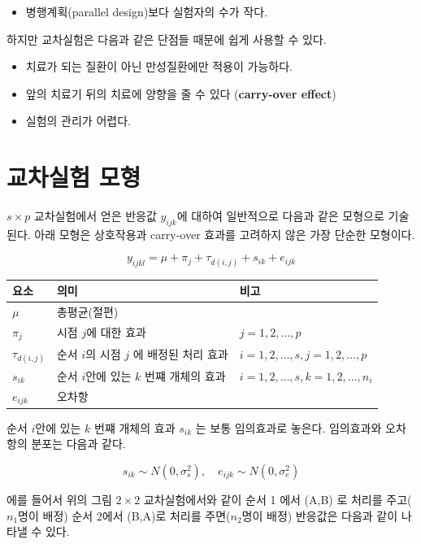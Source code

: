 \documentclass[
]{book}
\providecommand{\tightlist}{%
  \setlength{\itemsep}{0pt}\setlength{\parskip}{0pt}}
\theoremstyle{definition}
\theoremstyle{definition}
\theoremstyle{definition}
\theoremstyle{remark}
\begin{document}
\begin{itemize}
\tightlist
\item
  병행계획(parallel design)보다 실험자의 수가 작다.
\end{itemize}

하지만 교차실험은 다음과 같은 단점들 때문에 쉽게 사용할 수 있다.

\begin{itemize}
\tightlist
\item
  치료가 되는 질환이 아닌 만성질환에만 적용이 가능하다.
\item
  앞의 치료기 뒤의 치료에 양향을 줄 수 있다 (\textbf{carry-over effect})
\item
  실험의 관리가 어렵다.
\end{itemize}

\hypertarget{uxad50uxcc28uxc2e4uxd5d8-uxbaa8uxd615}{%
\section{교차실험 모형}\label{uxad50uxcc28uxc2e4uxd5d8-uxbaa8uxd615}}

\(s \times p\) 교차실험에서 얻은 반응값 \(y_{ijk}\)에 대하여 일반적으로 다음과 같은 모형으로 기술된다.
아래 모형은 상호작용과 carry-over 효과를 고려하지 않은 가장 단순한 모형이다.

\begin{equation}
y_{ijkl} = \mu + \pi_j + \tau_{d(i,j)}  + s_{ik}  + e_{ijk} 
\label{eq:crossmodel2}
\end{equation}

\begin{longtable}[]{@{}lll@{}}
\toprule
요소 & 의미 & 비고\tabularnewline
\midrule
\endhead
\(\mu\) & 총평균(절편) &\tabularnewline
\(\pi_j\) & 시점 \(j\)에 대한 효과 & \(j=1,2,\dots,p\)\tabularnewline
\(\tau_{d(i,j)}\) & 순서 \(i\)의 시점 \(j\) 에 배정된 처리 효과 & \(i=1,2,\dots,s, j=1,2,\dots,p\)\tabularnewline
\(s_{ik}\) & 순서 \(i\)안에 있는 \(k\) 번쨰 개체의 효과 & \(i=1,2,\dots,s, k=1,2,\dots, n_i\)\tabularnewline
\(e_{ijk}\) & 오차항 &\tabularnewline
\bottomrule
\end{longtable}

순서 \(i\)안에 있는 \(k\) 번쨰 개체의 효과 \(s_{ik}\) 는 보통 임의효과로 놓은다. 임의효과와 오차항의 분포는 다음과 같다.

\[ s_{ik} \sim N(0, \sigma_s^2), \quad e_{ijk} \sim N(0, \sigma_e^2) \]

에를 들어서 위의 그림 \(2 \times 2\) 교차실험에서와 같이 순서 1 에서 (A,B) 로 처리를 주고(\(n_1\)명이 배정) 순서 2에서 (B,A)로 처리를 주면(\(n_2\)명이 배정) 반응값은 다음과 같이 나타낼 수 있다.
\end{document}
